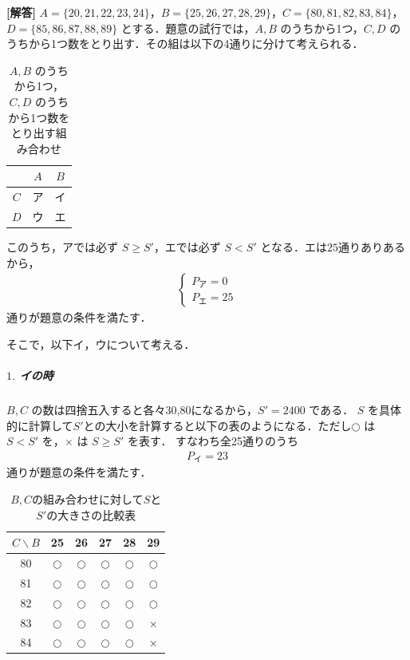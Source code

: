\documentclass[../../main.tex]{subfiles}
\begin{document}
\begin{oframed}
  
\end{oframed}

{\bf [解答]}
$A=\{20,21,22,23,24\}$，$B=\{25,26,27,28,29\}$，$C=\{80,81,82,83,84\}$，
$D=\{85,86,87,88,89\}$ とする．題意の試行では，$A,B$ のうちから1つ，$C,D$ のうちから1つ数をとり出す．その組は以下の4通りに分けて考えられる．

\begin{table}[htb]
  \centering
  \caption{$A,B$ のうちから1つ，$C,D$ のうちから1つ数をとり出す組み合わせ}
  \begin{tabular}{c|c|c}
    & $A$ & $B$ \\
    \hline
    $C$ & ア & イ \\
    \hline
    $D$ & ウ & エ
  \end{tabular}
\end{table}

このうち，アでは必ず $S\ge S'$，エでは必ず $S<S'$ となる．エは$25$通りありあるから，
\begin{align}
  \begin{cases}
    P_{\text{ア}} = 0 \\
    P_{\text{エ}} = 25
  \end{cases} \label{eq:1}
\end{align}
通りが題意の条件を満たす．

そこで，以下イ，ウについて考える．

\subparagraph{$1.$ イの時}

$B,C$ の数は四捨五入すると各々30,80になるから，$S'=2400$ である．
$S$ を具体的に計算して$S'$との大小を計算すると以下の表のようになる．ただし$\bigcirc$ は $S<S'$ を，$\times$ は $S\ge S'$ を表す．
すなわち全25通りのうち
\begin{align}
  P_{\text{イ}} = 23 \label{eq:2}
\end{align}
通りが題意の条件を満たす．

\begin{table}[htb]
  \begin{center}
    \caption{$B,C$の組み合わせに対して$S$と$S'$の大きさの比較表}
    \begin{tabular}{c|c|c|c|c|c}
      $C\backslash B$ & 25 & 26 & 27 & 28 & 29 \\
      \hline
      80 & $\bigcirc$ & $\bigcirc$ & $\bigcirc$ & $\bigcirc$ & $\bigcirc$ \\
      \hline
      81 & $\bigcirc$ & $\bigcirc$ & $\bigcirc$ & $\bigcirc$ & $\bigcirc$ \\
      \hline
      82 & $\bigcirc$ & $\bigcirc$ & $\bigcirc$ & $\bigcirc$ & $\bigcirc$ \\
      \hline
      83 & $\bigcirc$ & $\bigcirc$ & $\bigcirc$ & $\bigcirc$ & $\times$ \\
      \hline
      84 & $\bigcirc$ & $\bigcirc$ & $\bigcirc$ & $\bigcirc$ & $\times$
    \end{tabular}
  \end{center}
\end{table}
\end{document}
